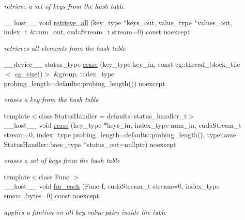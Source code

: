 \begin{DoxyCompactItemize}
\begin{DoxyCompactList}\small\item\em retrieve a set of keys from the hash table \end{DoxyCompactList}\item 
\+\_\+\+\_\+host\+\_\+\+\_\+ void \hyperlink{classwarpcore_1_1CountingHashTable_aade49f5de5f2144d57cdcfe8b7ad6663}{retrieve\+\_\+all} (key\+\_\+type $\ast$keys\+\_\+out, value\+\_\+type $\ast$values\+\_\+out, index\+\_\+t \&num\+\_\+out, cuda\+Stream\+\_\+t stream=0) const noexcept
\begin{DoxyCompactList}\small\item\em retrieves all elements from the hash table \end{DoxyCompactList}\item 
\+\_\+\+\_\+device\+\_\+\+\_\+ status\+\_\+type \hyperlink{classwarpcore_1_1CountingHashTable_aee43cc21c75f1ad37e79604afa034363}{erase} (key\+\_\+type key\+\_\+in, const cg\+::thread\+\_\+block\+\_\+tile$<$ \hyperlink{classwarpcore_1_1CountingHashTable_aeaf1b333eb176da987dee4d003e5dddc}{cg\+\_\+size}()$>$ \&group, index\+\_\+type probing\+\_\+length=defaults\+::probing\+\_\+length()) noexcept
\begin{DoxyCompactList}\small\item\em erases a key from the hash table \end{DoxyCompactList}\item 
{\footnotesize template$<$class Status\+Handler  = defaults\+::status\+\_\+handler\+\_\+t$>$ }\\\+\_\+\+\_\+host\+\_\+\+\_\+ void \hyperlink{classwarpcore_1_1CountingHashTable_ac43612ae6bae1c2b01c3b2af63d7a652}{erase} (key\+\_\+type $\ast$keys\+\_\+in, index\+\_\+type num\+\_\+in, cuda\+Stream\+\_\+t stream=0, index\+\_\+type probing\+\_\+length=defaults\+::probing\+\_\+length(), typename Status\+Handler\+::base\+\_\+type $\ast$status\+\_\+out=nullptr) noexcept
\begin{DoxyCompactList}\small\item\em erases a set of keys from the hash table \end{DoxyCompactList}\item 
{\footnotesize template$<$class Func $>$ }\\\+\_\+\+\_\+host\+\_\+\+\_\+ void \hyperlink{classwarpcore_1_1CountingHashTable_aea11af31c41fe5d7369b42f2b74d276a}{for\+\_\+each} (Func f, cuda\+Stream\+\_\+t stream=0, index\+\_\+type smem\+\_\+bytes=0) const noexcept
\begin{DoxyCompactList}\small\item\em applies a funtion on all key value pairs inside the table \end{DoxyCompactList}\item 

\end{DoxyCompactItemize}
